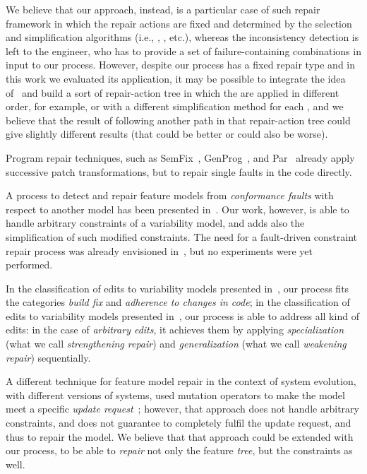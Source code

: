 \begin{tikzborder}{\cite{Gargantini16:validation}}
\begin{tikzborder}{\cite{gargantini_combinatorial_2017}}
\begin{tikzborder}{\cite{gargantini_combinatorial_2017}}
\begin{tikzborder}{\cite{garn2019}}
\begin{tikzborder}{\cite{arcaini2019achieving}}
\begin{tikzborder}{\cite{arcaini2019varivolution}}
		We believe that our approach, instead, is a particular case of such repair framework in which the repair actions are fixed and determined by the selection and simplification algorithms (i.e., \espresso, \qm, etc.), whereas the inconsistency detection is left to the engineer, who has to provide a set of failure-containing combinations in input to our process. However, despite our process has a fixed repair type and in this work we evaluated its application, it may be possible to integrate the idea of~\cite{reder_computing_2012} and build a sort of repair-action tree in which the \fccs are applied in different order, for example, or with a different simplification method for each \fcc, and we believe that the result of following another path in that repair-action tree could give slightly different results (that could be better or could also be worse).
		
		\bb
		Program repair techniques, such as SemFix~\cite{Nguyen_2013}, GenProg~\cite{le_goues_systematic_2012}, and Par~\cite{kim_automatic_2013} already apply successive patch transformations, but to repair single faults in the code directly.
		
		A process to detect and repair feature models from \textit{conformance faults} with respect to another model has been presented in~\cite{icst2016}. Our work, however, is able to handle arbitrary constraints of a variability model, and adds also the simplification of such modified constraints. The need for a fault-driven constraint repair process was already envisioned in~\cite{henard_towards_2013}, but no experiments were yet performed.
		
		In the classification of edits to variability models presented in~\cite{lotufo_evolution_2010}, our process fits the categories \textit{build fix} and \textit{adherence to changes in code}; in the classification of edits to variability models presented in~\cite{thum_reasoning_2009}, our process is able to address all kind of edits: in the case of {\it arbitrary edits}, it achieves them by applying \textit{specialization} (what we call \textit{strengthening repair}) and \textit{generalization} (what we call \textit{weakening repair}) sequentially.
		
		A different technique for feature model repair in the context of system evolution, with different versions of systems, used mutation operators to make the model meet a specific \textit{update request}~\cite{arcaini2019achieving,arcaini_evolutionary_2018}; however, that approach does not handle arbitrary constraints, and does not guarantee to completely fulfil the update request, and thus to repair the model. We believe that that approach could be extended with our process, to be able to \textit{repair} not only the feature \textit{tree}, but the constraints as well.
		

\end{tikzborder}
\end{tikzborder}
\end{tikzborder}
\end{tikzborder}
\end{tikzborder}
\end{tikzborder}
